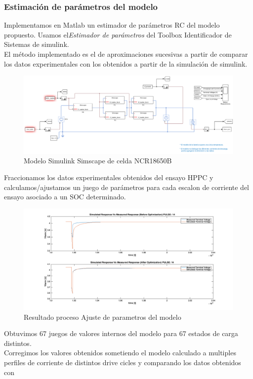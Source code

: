 \documentclass[10pt]{beamer}
\theoremstyle{remark}
\theoremstyle{definition}
\begin{document}
\begin{frame}[allowframebreaks]
	\frametitle{Estimación de parámetros del modelo}
  	Implementamos en Matlab un estimador de parámetros RC del 
  	modelo propuesto. Usamos el\emph{Estimador de parámetros} del Toolbox 
  	Identificador de Sistemas de simulink.\\
  	El método implementado es el de aproximaciones sucesivas a partir de comparar 
  	los datos experimentales con los obtenidos a partir de la simulación de 
  	simulink.
  	\begin{figure}[!hb]
		\centering
		\includegraphics[width=0.9\linewidth]{images/battery_model_simulink.png}
		\caption{Modelo Simulink Simscape de celda  NCR18650B }
		\label{fig:simulink_celda}
  	\end{figure}
  	Fraccionamos los datos experimentales obtenidos del ensayo HPPC y calculamos/ajustamos
  	un juego de parámetros para cada escalon de corriente del ensayo asociado a 
  	un SOC determinado.
  	\begin{figure}[!hb]
		\centering
		\includegraphics[width=0.9\linewidth]{images/Optimizacion.png}
		\caption{Resultado proceso Ajuste de parametros del modelo}
		\label{fig:RC_Opt}
  	\end{figure}
  	\framebreak
  	Obtuvimos 67 juegos de valores internos del modelo para 67 estados de carga distintos.\\
  	Corregimos los valores obtenidos sometiendo el modelo calculado a multiples 
  	perfiles de corriente de distintos drive cicles y comparando los datos obtenidos con 

\end{frame}
\end{document}
